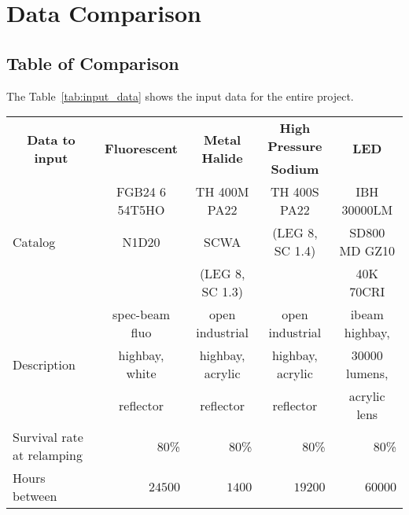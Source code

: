 \chapter{Data Comparison}

\section{Table of Comparison}

The Table~\ref{tab:input_data} shows the input data for the entire project.

\begin{table}
\centering
\footnotesize
\begin{tabular}{|l|r|r|r|r|}
  \hline
  \multicolumn{1}{|c|}{\multirow{2}{*}{\textbf{Data to input}}} & \multicolumn{1}{c|}{\multirow{2}{*}{\textbf{Fluorescent}}} & \multicolumn{1}{c|}{\multirow{2}{*}{\textbf{Metal Halide}}} & \multicolumn{1}{c|}{\textbf{High Pressure}} & \multicolumn{1}{c|}{\multirow{2}{*}{\textbf{LED}}} \\
  & & & \multicolumn{1}{c|}{\textbf{Sodium}} & \\
  \hline
  \hline
  \multirow{3}{*}{Catalog} & \multicolumn{1}{c|}{FGB24 6 54T5HO} & \multicolumn{1}{c|}{TH 400M PA22} & \multicolumn{1}{c|}{TH 400S PA22} & \multicolumn{1}{c|}{IBH 30000LM} \\
                           & \multicolumn{1}{c|}{N1D20} & \multicolumn{1}{c|}{SCWA} & \multicolumn{1}{c|}{(LEG 8, SC 1.4)} & \multicolumn{1}{c|}{SD800 MD GZ10} \\
			   & & \multicolumn{1}{c|}{(LEG 8, SC 1.3) }& & \multicolumn{1}{c|}{40K 70CRI} \\
  \hline
  \multirow{3}{*}{Description} & \multicolumn{1}{c|}{spec-beam fluo} & \multicolumn{1}{c|}{open industrial} & \multicolumn{1}{c|}{open industrial} & \multicolumn{1}{c|}{ibeam highbay,} \\
                               & \multicolumn{1}{c|}{highbay, white} & \multicolumn{1}{c|}{highbay, acrylic} & \multicolumn{1}{c|}{highbay, acrylic} & \multicolumn{1}{c|}{30000 lumens,} \\
                               & \multicolumn{1}{c|}{reflector} & \multicolumn{1}{c|}{reflector} & \multicolumn{1}{c|}{reflector} & \multicolumn{1}{c|}{acrylic lens} \\
  \hline
  Survival rate at relamping & 80\% & 80\% & 80\% & 80\% \\
  \hline
  Hours between & \multirow{2}{*}{$24500$} & \multirow{2}{*}{$1400$} & \multirow{2}{*}{$19200$} & \multirow{2}{*}{$60000$} \\

\end{tabular}
\end{table}
